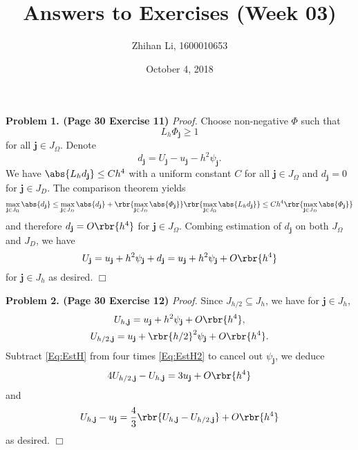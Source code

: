 \documentclass[english, nochinese]{pnote}
\title{Answers to Exercises (Week 03)}
\author{Zhihan Li, 1600010653}
\date{October 4, 2018}
\begin{document}
\maketitle

\textbf{Problem 1. (Page 30 Exercise 11)} \textit{Proof.} Choose non-negative $\varPhi$ such that 
\begin{equation}
L_h \varPhi_{\mathbf{j}} \ge 1
\end{equation}
for all $ \mathbf{j} \in J_{\Omega} $. Denote
\begin{equation}
d_\mathbf{j} = U_{\mathbf{j}} - u_{\mathbf{j}} - h^2 \psi_{\mathbf{j}}.
\end{equation}
We have $ \abs{ L_h d_{\mathbf{j}} } \le C h^4 $ with a uniform constant $C$ for all $ \mathbf{j} \in J_{\Omega} $ and $ d_{\mathbf{j}} = 0 $ for $ \mathbf{j} \in J_D $. The comparison theorem yields
\begin{equation}
\max_{ \mathbf{j} \in J_{\Omega} } \abs{d_\mathbf{j}} \le \max_{ \mathbf{j} \in J_D } \abs{d_\mathbf{j}} + \rbr{ \max_{ \mathbf{j} \in J_D } \abs{\varPhi_{\mathbf{j}}} } \rbr{ \max_{ \mathbf{j} \in J_{\Omega} } \abs{ L_h d_{\mathbf{j}} } } \le C h^4 \rbr{ \max_{ \mathbf{j} \in J_D } \abs{\varPhi_{\mathbf{j}}} }
\end{equation}
and therefore $ d_{\mathbf{j}} = O \rbr{h^4} $ for $ \mathbf{j} \in J_{\Omega} $.
Combing estimation of $d_{\mathbf{j}}$ on both $J_{\Omega}$ and $J_D$, we have
\begin{equation}
U_{\mathbf{j}} = u_{\mathbf{j}} + h^2 \psi_{\mathbf{j}} + d_{\mathbf{j}} = u_{\mathbf{j}} + h^2 \psi_{\mathbf{j}} + O \rbr{h^4}
\end{equation}
for $ \mathbf{j} \in J_h $ as desired.
\hfill$\Box$

\textbf{Problem 2. (Page 30 Exercise 12)} \textit{Proof.} Since $ J_{ h / 2 } \subseteq J_h $, we have for $ \mathbf{j} \in J_h $,
\begin{gather}
\label{Eq:EstH}
U_{ h, \mathbf{j} } = u_{\mathbf{j}} + h^2 \psi_{\mathbf{j}} + O \rbr{h^4}, \\
\label{Eq:EstH2}
U_{ h / 2, \mathbf{j} } = u_{\mathbf{j}} + \rbr{ h / 2 }^2 \psi_{\mathbf{j}} + O \rbr{h^4}.
\end{gather}
Subtract \eqref{Eq:EstH} from four times \eqref{Eq:EstH2} to cancel out $\psi_{\mathbf{j}}$, we deduce
\begin{equation}
4 U_{ h / 2, \mathbf{j} } - U_{ h, \mathbf{j} } = 3 u_{\mathbf{j}} + O \rbr{h^4}
\end{equation}
and
\begin{equation}
U_{ h, \mathbf{j} } - u_{\mathbf{j}} = \frac{4}{3} \rbr{ U_{ h, \mathbf{j} } - U_{ h / 2, \mathbf{j} } } + O \rbr{h^4}
\end{equation}
as desired.
\hfill$\Box$
\end{document}
